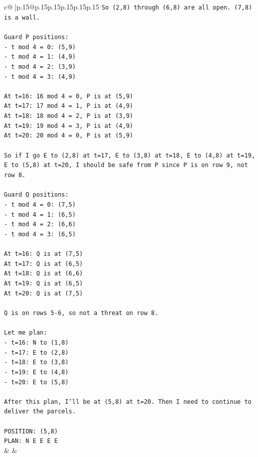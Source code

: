 \documentclass{article}
\begin{document}
{\begin{supertabular}{c@{$\;$}|p{.15\linewidth}@{}p{.15\linewidth}p{.15\linewidth}p{.15\linewidth}p{.15\linewidth}p{.15\linewidth}}
{{{\texttt{So (2,8) through (6,8) are all open. (7,8) is a wall.} \\
\\ 
\texttt{Guard P positions:} \\
\texttt{{-} t mod 4 = 0: (5,9)} \\
\texttt{{-} t mod 4 = 1: (4,9)} \\
\texttt{{-} t mod 4 = 2: (3,9)} \\
\texttt{{-} t mod 4 = 3: (4,9)} \\
\\ 
\texttt{At t=16: 16 mod 4 = 0, P is at (5,9)} \\
\texttt{At t=17: 17 mod 4 = 1, P is at (4,9)} \\
\texttt{At t=18: 18 mod 4 = 2, P is at (3,9)} \\
\texttt{At t=19: 19 mod 4 = 3, P is at (4,9)} \\
\texttt{At t=20: 20 mod 4 = 0, P is at (5,9)} \\
\\ 
\texttt{So if I go E to (2,8) at t=17, E to (3,8) at t=18, E to (4,8) at t=19, E to (5,8) at t=20, I should be safe from P since P is on row 9, not row 8.} \\
\\ 
\texttt{Guard Q positions:} \\
\texttt{{-} t mod 4 = 0: (7,5)} \\
\texttt{{-} t mod 4 = 1: (6,5)} \\
\texttt{{-} t mod 4 = 2: (6,6)} \\
\texttt{{-} t mod 4 = 3: (6,5)} \\
\\ 
\texttt{At t=16: Q is at (7,5)} \\
\texttt{At t=17: Q is at (6,5)} \\
\texttt{At t=18: Q is at (6,6)} \\
\texttt{At t=19: Q is at (6,5)} \\
\texttt{At t=20: Q is at (7,5)} \\
\\ 
\texttt{Q is on rows 5{-}6, so not a threat on row 8.} \\
\\ 
\texttt{Let me plan:} \\
\texttt{{-} t=16: N to (1,8)} \\
\texttt{{-} t=17: E to (2,8)} \\
\texttt{{-} t=18: E to (3,8)} \\
\texttt{{-} t=19: E to (4,8)} \\
\texttt{{-} t=20: E to (5,8)} \\
\\ 
\texttt{After this plan, I'll be at (5,8) at t=20. Then I need to continue to deliver the parcels.} \\
\\ 
\texttt{POSITION: (5,8)} \\
\texttt{PLAN: N E E E E} \\
            }
        }
    }
    & & \\ \\


\end{supertabular}}
\end{document}
